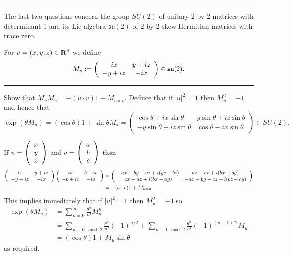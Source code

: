 \documentclass[12pt]{article}
\begin{document}
\hrule
\bigskip
The last two questions concern the group $SU(2)$ of unitary 2-by-2 matrices with determinant 1 and its Lie algebra $\mathfrak{su}(2)$ of 2-by-2 skew-Hermitian matrices with trace zero.

For $v=(x,y,z)\in\mathbf{R}^3$ we define
\[M_v:=\left(\begin{array}{cc}ix & y+iz\\ -y+iz & -ix\end{array}\right)\in\mathfrak{su}(2).\]
\bigskip
\hrule
\bigskip
\begin{question}\label{qun:su2exp}
Show that $M_uM_v=-(u\cdot v)1+M_{u\times v}$. Deduce that if $|u|^2=1$ then $M_u^2=-1$ and hence that
\[\exp(\theta M_u)=(\cos\theta)1+\sin\theta M_u=\left(\begin{array}{cc}
\cos\theta+ix\sin\theta & y\sin\theta+iz\sin\theta\\
-y\sin\theta+iz\sin\theta & \cos\theta-ix\sin\theta
\end{array}\right)\in SU(2).\]
\end{question}

\begin{answer}
If $u=\left(\begin{array}{c}x \\ y \\ z\end{array}\right)$ and $v=\left(\begin{array}{c}a \\ b \\ c\end{array}\right)$ then
\begin{align*}\left(\begin{array}{cc}ix & y+iz\\ -y+iz & -ix\end{array}\right)\left(\begin{array}{cc}ia & b+ic\\ -b+ic & -ia\end{array}\right)&=\left(\begin{array}{cc}-ax-by-cz+i(yc-bz) & az-cx+i(bx-ay)\\ cx-az+i(bx-ay) & -ax-by-cz+i(bz-cy)\end{array}\right)\\
&=-(u\cdot v)1+M_{u\times v}
\end{align*}
This implies immediately that if $|u|^2=1$ then $M_u^2=-1$ so
\begin{align*}
\exp(\theta M_u)&=\sum_{n=0}^{\infty}\frac{\theta^n}{n!}M^n_u\\
                &=\sum_{n\equiv 0\mod 2}\frac{\theta^n}{n!}(-1)^{n/2}+\sum_{n\equiv 1\mod 2}\frac{\theta^n}{n!}(-1)^{(n-1)/2}M_u\\
                &=(\cos\theta)1+M_u\sin\theta
\end{align*}
as required.
\end{answer}
\newpage

\bigskip
\end{document}

